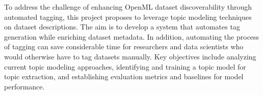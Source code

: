 \documentclass{article}
\begin{document}

To address the challenge of enhancing OpenML dataset discoverability through automated tagging, this project proposes to leverage topic modeling techniques on dataset descriptions. The aim is to develop a system that automates tag generation while enriching dataset metadata. In addition, automating the process of tagging can save considerable time for researchers and data scientists who would otherwise have to tag datasets manually. Key objectives include analyzing current topic modeling approaches, identifying and training a topic model for topic extraction, and establishing evaluation metrics and baselines for model performance.
\end{document}
